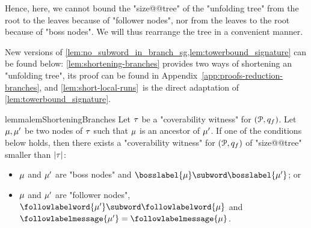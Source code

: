 Hence, here, we cannot bound the "size@@tree" of the "unfolding tree" from the root to the leaves because of "follower nodes", nor from the leaves to the root because of "boss nodes". 
We will thus rearrange the tree in a convenient manner. 

New versions of \cref{lem:no_subword_in_branch_sg,lem:towerbound_signature} can be found below: \cref{lem:shortening-branches} provides two ways of shortening an "unfolding tree", its proof can be found in Appendix~\ref{app:proofs-reduction-branches}, and \cref{lem:short-local-runs}~is the direct adaptation of \cref{lem:towerbound_signature}.







\begin{restatable}{lemma}{lemShorteningBranches} 
\label{lem:shortening-branches}
	Let $\tau$ be a "coverability witness" for $(\mathcal{P}, q_f)$.
	Let $\mu, \mu'$ be two nodes of $\tau$ such that $\mu$ is an ancestor of $\mu'$. If one of the conditions below holds, then there exists a "coverability witness" for $(\mathcal{P}, q_f)$ of "size@@tree" smaller than $|\tau|$:
	\begin{itemize}
	\item $\mu$ and $\mu'$ are "boss nodes" and $\bosslabel{\node} \subword \bosslabel{\node'}$; or
	\item $\mu$ and $\mu'$ are "follower nodes", $\followlabelword{\node'} \subword \followlabelword{\node}$ and $\followlabelmessage{\node'}=\followlabelmessage{\node}$.
	\end{itemize} 
\end{restatable}



%
%


